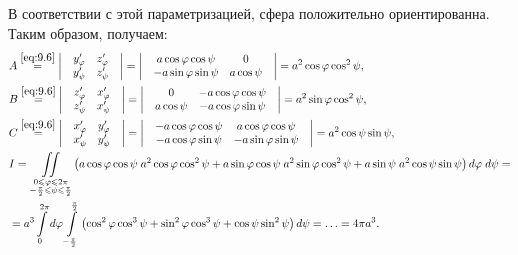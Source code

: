 \begin{example}
    \newpage
    В соответствии с этой параметризацией, сфера положительно ориентированна. Таким образом, получаем:
    \begin{align*}    
         & A \overset{\eqref{eq:9.6}}{=}
         \abs{\begin{matrix}
             & y_\varphi' & z_\varphi' & \\
             & y_\psi' & z_\psi'
        \end{matrix}} =
         \abs{\begin{matrix}
             & a \cos \varphi \cos \psi & 0 & \\
             & - a \sin \varphi \sin \psi & a \cos \psi
         \end{matrix}} =
        a^2 \cos \varphi \cos^2 \psi, \\        
        & B \overset{\eqref{eq:9.6}}{=}
        \abs{\begin{matrix}
            & z_\varphi' & x_\varphi' & \\
            & z_\psi' & x_\psi'
            \end{matrix}} =
        \abs{\begin{matrix}
            & 0 &  - a \cos \varphi \cos \psi &  \\
            & a \cos \psi & - a \cos \varphi \sin \psi 
            \end{matrix}} =
        a^2 \sin \varphi \cos^2 \psi, \\      
        & C \overset{\eqref{eq:9.6}}{=}
        \abs{\begin{matrix}
            & x_\varphi' & y_\varphi' & \\
            & x_\psi' & y_\psi'
            \end{matrix}} =
        \abs{\begin{matrix}
            &  - a \cos \varphi \cos \psi &  a \cos \varphi \cos \psi & \\
            & - a \cos \varphi \sin \psi  & - a \sin \varphi \sin \psi
            \end{matrix}} =
        a^2 \cos \psi \sin \psi, \\        
        & I = \underset{\substack{ 0 \leq \varphi \leq 2 \pi \\ - \frac{\pi}{2} \leq \psi \leq \frac{\pi}{2} }}{\diint} 
        \left(
            a \cos \varphi \cos \psi \;%
            a^2 \cos \varphi \cos^2 \psi +          
            a \sin \varphi \cos \psi  \; %
            a^2 \sin \varphi \cos^2 \psi +            
            a \sin \psi \; %
            a^2 \cos \psi \sin \psi
        \right) d \varphi \; d \psi = \\
        & = a^3 \intl_0^{2\pi} d\varphi \intl_{-\frac{\pi}{2}}^{\frac{\pi}{2}}
        \left(
            \cos^2 \varphi \cos^3 \psi +
            \sin ^2 \varphi \cos^3 \psi +            
            \cos \psi \sin^2 \psi
        \right) d \psi = \ldots = 4 \pi a^3.
    \end{align*}
\end{example}

